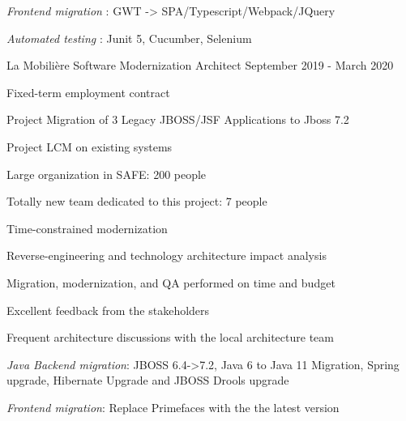 \begin{cventries}
{{\begin{cvitems}
                \item{\emph{Frontend migration} : GWT -> SPA/Typescript/Webpack/JQuery}
                \item{\emph{Automated testing} : Junit 5, Cucumber, Selenium}
            \end{cvitems}
            }
        }
        \cventry
        {} %
        {} %
        {} %
        {} %
        {
            \globalexperience
            {La Mobilière} %
            {Software Modernization Architect} %
            {September 2019 - March 2020} %
            {
                \begin{cvitems} %
                    \item{Fixed-term employment contract}
                    \item{Project Migration of 3 Legacy JBOSS/JSF Applications to Jboss 7.2}
                    \item{Project LCM on existing systems}
                    \item{Large organization in SAFE: 200 people}
                    \item{Totally new team dedicated to this project: 7 people}
                    \item{Time-constrained modernization}
                    \item{Reverse-engineering and technology architecture impact analysis}
                \end{cvitems}
            }
            {
                \begin{cvitems} %
                    \item{Migration, modernization, and QA performed on time and budget}
                    \item{Excellent feedback from the stakeholders}
                    \item{Frequent architecture discussions with the local architecture team}
                \end{cvitems}
            }
            {
                \begin{cvitems} %
                    \item{\emph{Java Backend migration}: JBOSS 6.4->7.2, Java 6 to Java 11 Migration, Spring upgrade, Hibernate Upgrade and JBOSS Drools upgrade}
                    \item{\emph{Frontend migration}: Replace Primefaces with the the latest version}

\end{cvitems}}}
\end{cventries}
